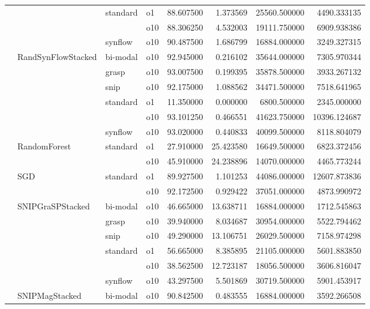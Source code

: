 \begin{longtable}{llllrrrr}
      &     & standard & o1 &  88.607500 &   1.373569 &     25560.500000 &   4490.333135 \\
      &     &         & o10 &  88.306250 &   4.532003 &     19111.750000 &   6909.938386 \\
      &     & synflow & o10 &  90.487500 &   1.686799 &     16884.000000 &   3249.327315 \\
      & RandSynFlowStacked & bi-modal & o10 &  92.945000 &   0.216102 &     35644.000000 &   7305.970344 \\
      &     & grasp & o10 &  93.007500 &   0.199395 &     35878.500000 &   3933.267132 \\
      &     & snip & o10 &  92.175000 &   1.088562 &     34471.500000 &   7518.641965 \\
      &     & standard & o1 &  11.350000 &   0.000000 &      6800.500000 &   2345.000000 \\
      &     &         & o10 &  93.101250 &   0.466551 &     41623.750000 &  10396.124687 \\
      &     & synflow & o10 &  93.020000 &   0.440833 &     40099.500000 &   8118.804079 \\
      & RandomForest & standard & o1 &  27.910000 &  25.423580 &     16649.500000 &   6823.372456 \\
      &     &         & o10 &  45.910000 &  24.238896 &     14070.000000 &   4465.773244 \\
      & SGD & standard & o1 &  89.927500 &   1.101253 &     44086.000000 &  12607.873836 \\
      &     &         & o10 &  92.172500 &   0.929422 &     37051.000000 &   4873.990972 \\
      & SNIPGraSPStacked & bi-modal & o10 &  46.665000 &  13.638711 &     16884.000000 &   1712.545863 \\
      &     & grasp & o10 &  39.940000 &   8.034687 &     30954.000000 &   5522.794462 \\
      &     & snip & o10 &  49.290000 &  13.106751 &     26029.500000 &   7158.974298 \\
      &     & standard & o1 &  56.665000 &   8.385895 &     21105.000000 &   5601.883850 \\
      &     &         & o10 &  38.562500 &  12.723187 &     18056.500000 &   3606.816047 \\
      &     & synflow & o10 &  43.297500 &   5.501869 &     30719.500000 &   5901.453917 \\
      & SNIPMagStacked & bi-modal & o10 &  90.842500 &   0.483555 &     16884.000000 &   3592.266508 \\

\end{longtable}
